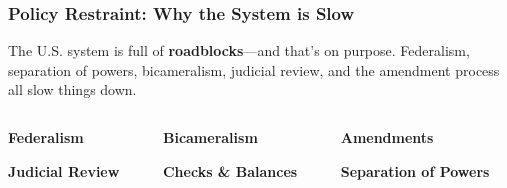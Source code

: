 \documentclass[10pt]{beamer}
\begin{document}
\begin{frame}
\frametitle{Policy Restraint: Why the System is Slow}

\begin{block}{}
The U.S. system is full of \textbf{roadblocks}---and that's on purpose. Federalism, separation of powers, bicameralism, judicial review, and the amendment process all slow things down.
\end{block}

\vspace{0.5cm}

\begin{columns}
\begin{column}{0.32\textwidth}
\pause
\begin{center}
\textcolor{titanblue}{\textbf{Federalism}}
\end{center}

\pause
\begin{center}
\textcolor{titanblue}{\textbf{Judicial Review}}
\end{center}
\end{column}

\begin{column}{0.32\textwidth}
\pause
\begin{center}
\textcolor{titanblue}{\textbf{Bicameralism}}
\end{center}

\pause
\begin{center}
\textcolor{titanblue}{\textbf{Checks \& Balances}}
\end{center}
\end{column}

\begin{column}{0.32\textwidth}
\pause
\begin{center}
\textcolor{titanblue}{\textbf{Amendments}}
\end{center}

\pause
\begin{center}
\textcolor{titanblue}{\textbf{Separation of Powers}}
\end{center}
\end{column}
\end{columns}

\end{frame}
\end{document}
